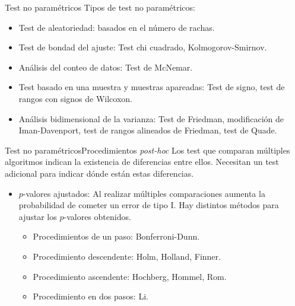 \documentclass[leqno]{beamer}
\theoremstyle{definition_wo_parentheses}
\begin{document}


\begin{frame}{Test no paramétricos}
	Tipos de test no paramétricos:
\begin{itemize}
\item Test de aleatoriedad: basados en el número de rachas.
\item Test de bondad del ajuste: Test chi cuadrado, 
	Kolmogorov-Smirnov.
\item Análisis del conteo de datos: Test de McNemar.
\item Test basado en una muestra y muestras apareadas: Test
	de signo, test de rangos con signos de Wilcoxon. 
\item Análisis bidimensional de la varianza: Test de 
	Friedman, modificación de Iman-Davenport, test de 
	rangos alineados de Friedman, test de Quade.
\end{itemize}
\end{frame}


\begin{frame}{Test no paramétricos}{Procedimientos \textit{post-hoc}}
	Los test que comparan múltiples algoritmos indican la
existencia de diferencias entre ellos. Necesitan un
test adicional para indicar dónde están estas diferencias.

\begin{itemize}
\item $p$-valores ajustados: Al realizar múltiples comparaciones aumenta la probabilidad de cometer un error de tipo I. Hay distintos métodos para ajustar los $p$-valores obtenidos.
\begin{itemize}
\item Procedimientos de un paso: Bonferroni-Dunn.
\item Procedimiento descendente: Holm, Holland, Finner.
\item Procedimiento ascendente:  Hochberg, Hommel, Rom.
\item Procedimiento en dos pasos: Li.
\end{itemize}
\end{itemize}
\end{frame}
\end{document}
